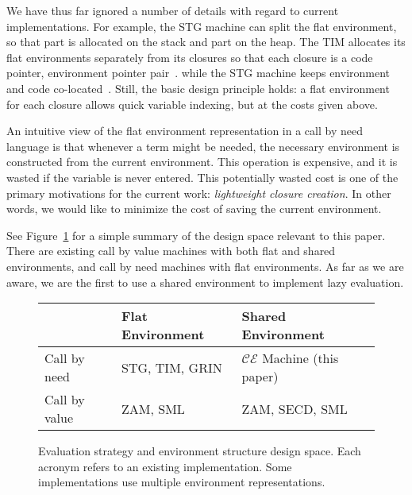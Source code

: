 We have thus far ignored a number of details with regard to current
implementations. For example, the STG machine can split the flat environment, so
that part is allocated on the stack and part on the heap.  The TIM allocates its
flat environments separately from its closures so that each closure is a code
pointer, environment pointer pair~\cite{TIM}. while the STG machine keeps
environment and code co-located~\cite{jonesstg}. Still, the basic design
principle holds: a flat environment for each closure allows quick variable
indexing, but at the costs given above.

An intuitive view of the flat environment representation in a call by need
language is that whenever a term might be needed, the necessary environment is
constructed from the current environment.  This operation is expensive, and
it is wasted if the variable is never entered. This potentially wasted cost is
one of the primary motivations for the current work: \emph{lightweight
closure creation}. In other words, we would like to minimize the cost of saving
the current environment.

See Figure~\ref{fig:designspace} for a simple summary of the design space
relevant to this paper. There are existing call by value machines with both flat
and shared environments, and call by need machines with flat environments. As
far as we are aware, we are the first to use a shared environment to implement
lazy evaluation.

\begin{figure}
\begin{tabularx}{\textwidth}{l | X | X}
                & Flat Environment     & Shared Environment \\ \hline
  Call by need  & STG, TIM, GRIN & $\mathcal{CE}$ Machine (this paper) \\
  Call by value & ZAM, SML & ZAM, SECD, SML \\
\end{tabularx}
\caption{Evaluation strategy and environment structure design space. Each
acronym refers to an existing implementation. Some implementations use multiple
environment representations.}
\label{fig:designspace}
\end{figure}

